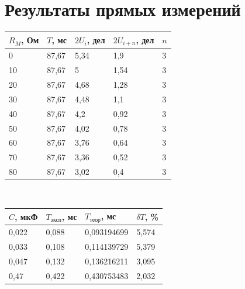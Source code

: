 \documentclass[14pt]{extarticle}
\begin{document}
    \section{Результаты прямых измерений}
    \begin{tabularx}{\textwidth}{|X|X|X|X|X|}
        \hline
        $R_M$, Ом & $T$, мс & $2U_i$, дел & $2U_{i+n}$, дел & $n$ \\\hline
        0  & 87,67 & 5,34 & 1,9  & 3 \\\hline
        10 &    87,67 & 5    & 1,54 & 3 \\\hline
        20 & 87,67 & 4,68 & 1,28 & 3 \\\hline
        30 & 87,67 & 4,48 & 1,1  & 3 \\\hline
        40 & 87,67 & 4,2  & 0,92 & 3 \\\hline
        50 & 87,67 & 4,02 & 0,78 & 3 \\\hline
        60 & 87,67 & 3,76 & 0,64 & 3 \\\hline
        70 & 87,67 & 3,36 & 0,52 & 3 \\\hline
        80 & 87,67 & 3,02 & 0,4  & 3 \\\hline
        
    \end{tabularx}
    \vspace*{5mm}\\
    \begin{tabularx}{\textwidth}{|X|X|X|X|}
        \hline
        $C$, мкФ & $T_{\text{эксп}}$, мс & $T_{\text{теор}}$, мс & $\delta T$, \% \\\hline
        0,022 & 0,088 & 0,093194699 & 5,574 \\\hline
        0,033 & 0,108 & 0,114139729 & 5,379 \\\hline
        0,047 & 0,132 & 0,136216211 & 3,095 \\\hline
        0,47  & 0,422 & 0,430753483 & 2,032 \\\hline
    \end{tabularx}

    \newpage
\end{document}
